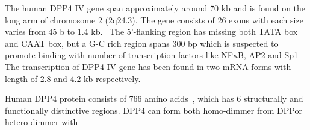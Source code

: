 The human DPP4 IV gene span approximately around 70 kb and is found on the long arm of chromosome 2 (2q24.3). The gene consists of 26 exons with each size varies from 45 b to 1.4 kb.~\cite{Abbott1994} The 5'-flanking region has missing both TATA box and CAAT box, but a G-C rich region spans 300 bp which is suspected to promote binding with number of transcription factors like NF$\kappa$B, AP2 and Sp1~\cite{Abbott1994,Böhm1995} The transcription of DPP4 IV gene has been found in two mRNA forms with length of 2.8 and 4.2 kb respectively. 
\par
Human DPP4 protein consists of 766 amino acids~\cite{Bär2003,Misumi1992}, which has 6 structurally and functionally distinctive regions. DPP4 can form both homo-dimmer from DPPor hetero-dimmer with 